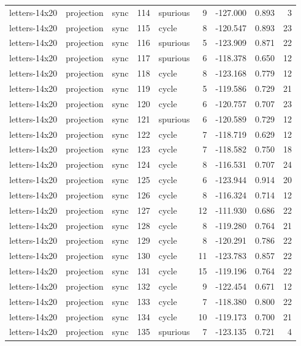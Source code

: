\begin{tabular}{lllrlrrrr}
letters-14x20 & projection & sync & 114 & spurious & 9 & -127.000 & 0.893 & 3 \\
letters-14x20 & projection & sync & 115 & cycle & 8 & -120.547 & 0.893 & 23 \\
letters-14x20 & projection & sync & 116 & spurious & 5 & -123.909 & 0.871 & 22 \\
letters-14x20 & projection & sync & 117 & spurious & 6 & -118.378 & 0.650 & 12 \\
letters-14x20 & projection & sync & 118 & cycle & 8 & -123.168 & 0.779 & 12 \\
letters-14x20 & projection & sync & 119 & cycle & 5 & -119.586 & 0.729 & 21 \\
letters-14x20 & projection & sync & 120 & cycle & 6 & -120.757 & 0.707 & 23 \\
letters-14x20 & projection & sync & 121 & spurious & 6 & -120.589 & 0.729 & 12 \\
letters-14x20 & projection & sync & 122 & cycle & 7 & -118.719 & 0.629 & 12 \\
letters-14x20 & projection & sync & 123 & cycle & 7 & -118.582 & 0.750 & 18 \\
letters-14x20 & projection & sync & 124 & cycle & 8 & -116.531 & 0.707 & 24 \\
letters-14x20 & projection & sync & 125 & cycle & 6 & -123.944 & 0.914 & 20 \\
letters-14x20 & projection & sync & 126 & cycle & 8 & -116.324 & 0.714 & 12 \\
letters-14x20 & projection & sync & 127 & cycle & 12 & -111.930 & 0.686 & 22 \\
letters-14x20 & projection & sync & 128 & cycle & 8 & -119.280 & 0.764 & 21 \\
letters-14x20 & projection & sync & 129 & cycle & 8 & -120.291 & 0.786 & 22 \\
letters-14x20 & projection & sync & 130 & cycle & 11 & -123.783 & 0.857 & 22 \\
letters-14x20 & projection & sync & 131 & cycle & 15 & -119.196 & 0.764 & 22 \\
letters-14x20 & projection & sync & 132 & cycle & 9 & -122.454 & 0.671 & 12 \\
letters-14x20 & projection & sync & 133 & cycle & 7 & -118.380 & 0.800 & 22 \\
letters-14x20 & projection & sync & 134 & cycle & 10 & -119.173 & 0.700 & 21 \\
letters-14x20 & projection & sync & 135 & spurious & 7 & -123.135 & 0.721 & 4 \\

\end{tabular}
